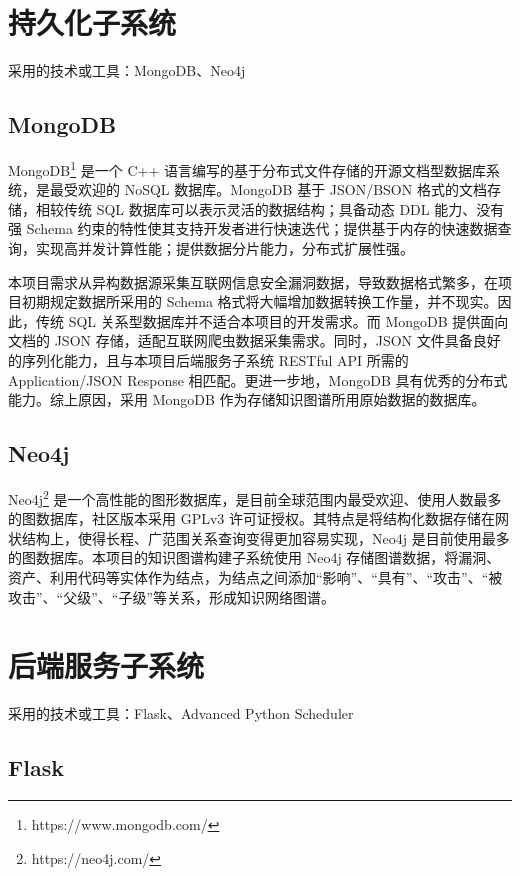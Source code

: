 \documentclass[a4paper,AutoFakeBold,oneside,12pt]{book}
\begin{document}
\section{持久化子系统}

采用的技术或工具：MongoDB、Neo4j

\subsection{MongoDB}

MongoDB\footnote{https://www.mongodb.com/} 是一个 C++ 语言编写的基于分布式文件存储的开源文档型数据库系统，是最受欢迎的 NoSQL 数据库。MongoDB 基于 JSON/BSON 格式的文档存储，相较传统 SQL 数据库可以表示灵活的数据结构；具备动态 DDL 能力、没有强 Schema 约束的特性使其支持开发者进行快速迭代；提供基于内存的快速数据查询，实现高并发计算性能；提供数据分片能力，分布式扩展性强。

本项目需求从异构数据源采集互联网信息安全漏洞数据，导致数据格式繁多，在项目初期规定数据所采用的 Schema 格式将大幅增加数据转换工作量，并不现实。因此，传统 SQL 关系型数据库并不适合本项目的开发需求。而 MongoDB 提供面向文档的 JSON 存储，适配互联网爬虫数据采集需求。同时，JSON 文件具备良好的序列化能力，且与本项目后端服务子系统 RESTful API 所需的 Application/JSON Response 相匹配。更进一步地，MongoDB 具有优秀的分布式能力。综上原因，采用 MongoDB 作为存储知识图谱所用原始数据的数据库。

\subsection{Neo4j}

Neo4j\footnote{https://neo4j.com/} 是一个高性能的图形数据库，是目前全球范围内最受欢迎、使用人数最多的图数据库，社区版本采用 GPLv3 许可证授权。其特点是将结构化数据存储在网状结构上，使得长程、广范围关系查询变得更加容易实现，Neo4j 是目前使用最多的图数据库。本项目的知识图谱构建子系统使用 Neo4j 存储图谱数据，将漏洞、资产、利用代码等实体作为结点，为结点之间添加“影响”、“具有”、“攻击”、“被攻击”、“父级”、“子级”等关系，形成知识网络图谱。

\section{后端服务子系统}

采用的技术或工具：Flask、Advanced Python Scheduler

\subsection{Flask}
\end{document}
